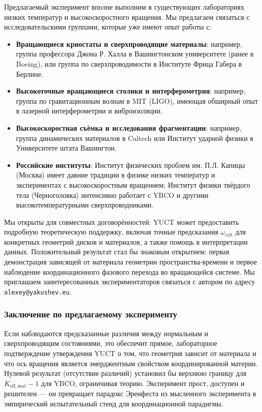\documentclass[12pt,a4paper]{article}
\begin{document}
	Предлагаемый эксперимент вполне выполним в существующих лабораториях низких температур и высокоскоростного вращения. Мы предлагаем связаться с исследовательскими группами, которые уже имеют опыт работы с:
	
	\begin{itemize}
		\item \textbf{Вращающиеся криостаты и сверхпроводящие материалы}: например, группа профессора Джона Р. Халла в Вашингтонском университете (ранее в Boeing), или группа по сверхпроводимости в Институте Фрица Габера в Берлине.
		\item \textbf{Высокоточные вращающиеся столики и интерферометрия}: например, группа по гравитационным волнам в MIT (LIGO), имеющая обширный опыт в лазерной интерферометрии и виброизоляции.
		\item \textbf{Высокоскоростная съёмка и исследования фрагментации}: например, группа динамических материалов в Caltech или Институт ударной физики в Университете штата Вашингтон.
		\item \textbf{Российские институты}: Институт физических проблем им. П.Л. Капицы (Москва) имеет давние традиции в физике низких температур и экспериментах с высокоскоростным вращением; Институт физики твёрдого тела (Черноголовка) интенсивно работает с YBCO и другими высокотемпературными сверхпроводниками.
	\end{itemize}
	
	Мы открыты для совместных договорённостей: YUCT может предоставить подробную теоретическую поддержку, включая точные предсказания \(\omega_{\text{crit}}\) для конкретных геометрий дисков и материалов, а также помощь в интерпретации данных. Положительный результат стал бы знаковым открытием: первая демонстрация зависящей от материала геометрии пространства-времени и первое наблюдение координационного фазового перехода во вращающейся системе. Мы приглашаем заинтересованных экспериментаторов связаться с автором по адресу \texttt{alexey@yakushev.eu}.
	
	\subsubsection{Заключение по предлагаемому эксперименту}
	
	Если наблюдаются предсказанные различия между нормальным и сверхпроводящим состояниями, это обеспечит прямое, лабораторное подтверждение утверждения YUCT о том, что геометрия зависит от материала и что ось вращения является эмерджентным свойством координированной материи. Нулевой результат (отсутствие различий) установил бы верхнюю границу для \(K_{\mathrm{eff,mat}} - 1\) для YBCO, ограничивая теорию. Эксперимент прост, доступен и решителен — он превращает парадокс Эренфеста из мысленного эксперимента в эмпирический испытательный стенд для координационной парадигмы.
	
\end{document}
